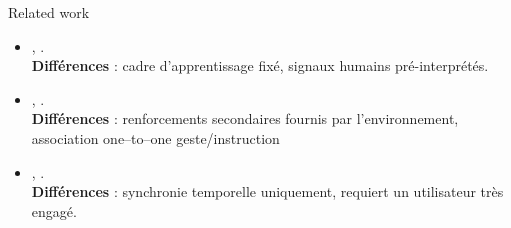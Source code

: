 \documentclass[xcolor=pst,dvips,12pt,english,french]{beamer}
\begin{document}
	\begin{frame}{Related work}
		\begin{block}{}
			\begin{itemize}
				\item \small
				, \citeauthor{knox2009}.\\
				\textbf{Différences} : cadre d'apprentissage fixé, signaux humains pré-interprétés.
				\item \small
				, \citeauthor{najar}.\\
				\textbf{Différences} : renforcements secondaires fournis par l'environnement, association one--to--one geste/instruction
				\item \small
				, \citeauthor{grand2014}.\\
				\textbf{Différences} : synchronie temporelle uniquement, requiert un utilisateur très engagé.
			\end{itemize}
		\end{block}
	\end{frame}
	

	
	
	
\end{document}
